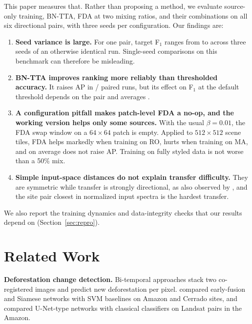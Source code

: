 \documentclass[11pt]{article}
\newcommand{\BNTTA}{BN-TTA}
\newcommand{\Fone}{F$_1$}
\begin{document}
This paper measures that.
Rather than proposing a method, we evaluate source-only training, \BNTTA{}, FDA at two mixing ratios, and their combinations on all six directional pairs, with three seeds per configuration.
Our findings are:
\begin{enumerate}[leftmargin=*, topsep=3pt, itemsep=2pt]
\item \textbf{Seed variance is large.} For one pair, target \Fone{} ranges from \SOWidestLo{} to \SOWidestHi{} across three seeds of an otherwise identical run. Single-seed comparisons on this benchmark can therefore be misleading.
\item \textbf{\BNTTA{} improves ranking more reliably than thresholded accuracy.} It raises AP in \TTAAPAllW{}/\TTAAPAllN{} paired runs, but its effect on \Fone{} at the default threshold depends on the pair and averages \TTAAllD{}.
\item \textbf{A configuration pitfall makes patch-level FDA a no-op, and the working version helps only some sources.} With the usual $\beta=0.01$, the FDA swap window on a $64\times64$ patch is empty. Applied to $512\times512$ scene tiles, FDA helps markedly when training on RO, hurts when training on MA, and on average does not raise AP. Training on fully styled data is not worse than a 50\% mix.
\item \textbf{Simple input-space distances do not explain transfer difficulty.} They are symmetric while transfer is strongly directional, as also observed by \citet{demoura2025enhancing}, and the site pair closest in normalized input spectra is the hardest transfer.
\end{enumerate}
We also report the training dynamics and data-integrity checks that our results depend on (Section~\ref{sec:repro}).

\section{Related Work}\label{sec:related}

\textbf{Deforestation change detection.}
Bi-temporal approaches stack two co-registered images and predict new deforestation per pixel.
\citet{ortegaadarme2020evaluation} compared early-fusion and Siamese networks with SVM baselines on Amazon and Cerrado sites, and \citet{debem2020change} compared U-Net-type networks with classical classifiers on Landsat pairs in the Amazon.
\end{document}
